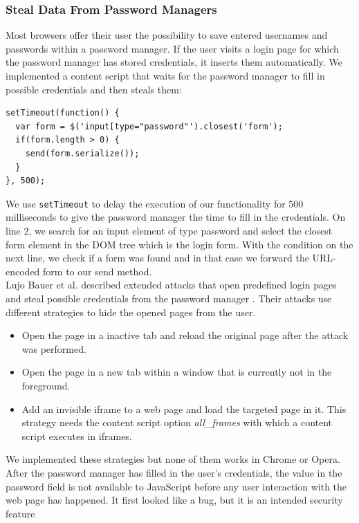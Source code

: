 \documentclass[article,colorback,accentcolor=tud9c,type=bsc]{tudthesis}
\let\stdsubsubsection\subsubsection
\renewcommand\subsubsection{\newpage\stdsubsubsection}
\begin{document}
\subsubsection{Steal Data From Password Managers}

	Most browsers offer their user the possibility to save entered usernames and passwords within a password manager. If the user visits a login page for which the password manager has stored credentials, it inserts them automatically. We implemented a content script that waits for the password manager to fill in possible credentials and then steals them: \\
	
	\begin{lstlisting}
setTimeout(function() {
  var form = $('input[type="password"').closest('form');
  if(form.length > 0) {
    send(form.serialize());
  }
}, 500);
	\end{lstlisting}
	
	We use \texttt{setTimeout} to delay the execution of our functionality for 500 milliseconds to give the password manager the time to fill in the credentials. On line 2, we search for an input element of type password and select the closest form element in the DOM tree which is the login form. With the condition on the next line, we check if a form was found and in that case we forward the URL-encoded form to our send method. \\
	
	Lujo Bauer et al. described extended attacks that open predefined login pages and steal possible credentials from the password manager \cite{extensions:cns14}. Their attacks use different strategies to hide the opened pages from the user. 
	\begin{itemize}
		\itemsep0em
		\item Open the page in a inactive tab and reload the original page after the attack was performed. 
		\item Open the page in a new tab within a window that is currently not in the foreground.
		\item Add an invisible iframe to a web page and load the targeted page in it. This strategy needs the content script option \textit{all\_frames} with which a content script executes in iframes. 
	\end{itemize}
	We implemented these strategies but none of them works in Chrome or Opera. After the password manager has filled in the user's credentials, the value in the password field is not available to JavaScript before any user interaction with the web page has happened. It first looked like a bug, but it is an intended security feature \cite{chromiumBlogPasswordInput} 
\end{document}
